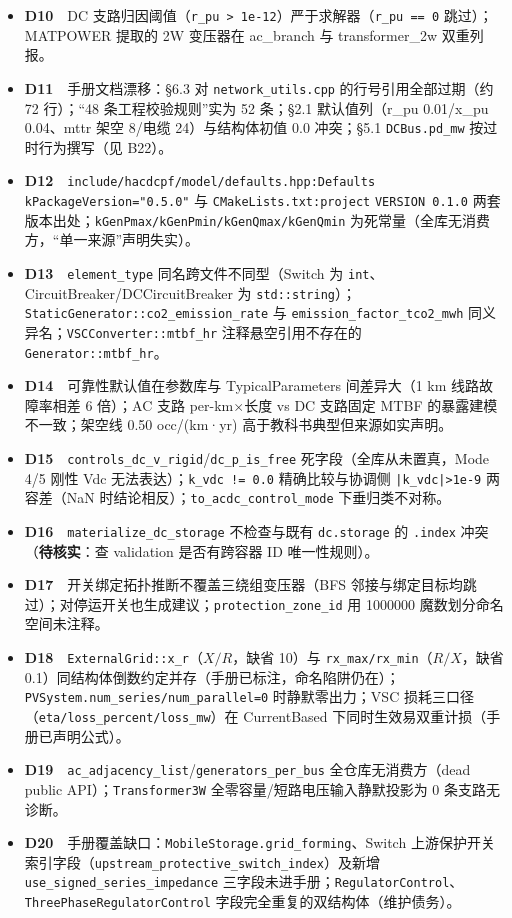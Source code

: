 \documentclass[11pt,a4paper,fontset=fandol]{ctexart}
\newcommand{\file}[1]{\texttt{#1}}
\begin{document}
\begin{itemize}
  \item \textbf{D10}　DC 支路归因阈值（\texttt{r\_pu > 1e-12}）严于求解器（\texttt{r\_pu == 0} 跳过）；MATPOWER 提取的 2W 变压器在 ac\_branch 与 transformer\_2w 双重列报。
  \item \textbf{D11}　手册文档漂移：\S 6.3 对 \file{network\_utils.cpp} 的行号引用全部过期（约 72 行）；``48 条工程校验规则''实为 52 条；\S 2.1 默认值列（r\_pu 0.01/x\_pu 0.04、mttr 架空 8/电缆 24）与结构体初值 0.0 冲突；\S 5.1 \texttt{DCBus.pd\_mw} 按过时行为撰写（见 B22）。
  \item \textbf{D12}　\texttt{include/hacdcpf/model/defaults.hpp:Defaults} \texttt{kPackageVersion="0.5.0"} 与 \file{CMakeLists.txt:project} \texttt{VERSION 0.1.0} 两套版本出处；\texttt{kGenPmax/kGenPmin/kGenQmax/kGenQmin} 为死常量（全库无消费方，``单一来源''声明失实）。
  \item \textbf{D13}　\texttt{element\_type} 同名跨文件不同型（Switch 为 \texttt{int}、CircuitBreaker/DCCircuitBreaker 为 \texttt{std::string}）；\texttt{StaticGenerator::co2\_emission\_rate} 与 \texttt{emission\_factor\_tco2\_mwh} 同义异名；\texttt{VSCConverter::mtbf\_hr} 注释悬空引用不存在的 \texttt{Generator::mtbf\_hr}。
  \item \textbf{D14}　可靠性默认值在参数库与 TypicalParameters 间差异大（1 km 线路故障率相差 6 倍）；AC 支路 per-km$\times$长度 vs DC 支路固定 MTBF 的暴露建模不一致；架空线 0.50 occ/(km·yr) 高于教科书典型但来源如实声明。
  \item \textbf{D15}　\texttt{controls\_dc\_v\_rigid}/\texttt{dc\_p\_is\_free} 死字段（全库从未置真，Mode 4/5 刚性 Vdc 无法表达）；\texttt{k\_vdc != 0.0} 精确比较与协调侧 \texttt{|k\_vdc|>1e-9} 两容差（NaN 时结论相反）；\texttt{to\_acdc\_control\_mode} 下垂归类不对称。
  \item \textbf{D16}　\texttt{materialize\_dc\_storage} 不检查与既有 \texttt{dc.storage} 的 \texttt{.index} 冲突（\textbf{待核实}：查 validation 是否有跨容器 ID 唯一性规则）。
  \item \textbf{D17}　开关绑定拓扑推断不覆盖三绕组变压器（BFS 邻接与绑定目标均跳过）；对停运开关也生成建议；\texttt{protection\_zone\_id} 用 1000000 魔数划分命名空间未注释。
  \item \textbf{D18}　\texttt{ExternalGrid::x\_r}（$X/R$，缺省 10）与 \texttt{rx\_max/rx\_min}（$R/X$，缺省 0.1）同结构体倒数约定并存（手册已标注，命名陷阱仍在）；\texttt{PVSystem.num\_series/num\_parallel=0} 时静默零出力；VSC 损耗三口径（\texttt{eta/loss\_percent/loss\_mw}）在 CurrentBased 下同时生效易双重计损（手册已声明公式）。
  \item \textbf{D19}　\file{ac\_adjacency\_list}/\file{generators\_per\_bus} 全仓库无消费方（dead public API）；\texttt{Transformer3W} 全零容量/短路电压输入静默投影为 0 条支路无诊断。
  \item \textbf{D20}　手册覆盖缺口：\texttt{MobileStorage.grid\_forming}、Switch 上游保护开关索引字段（\texttt{upstream\_protective\_switch\_index}）及新增 \texttt{use\_signed\_series\_impedance} 三字段未进手册；\texttt{RegulatorControl}、\texttt{ThreePhaseRegulatorControl} 字段完全重复的双结构体（维护债务）。
\end{itemize}
\end{document}
